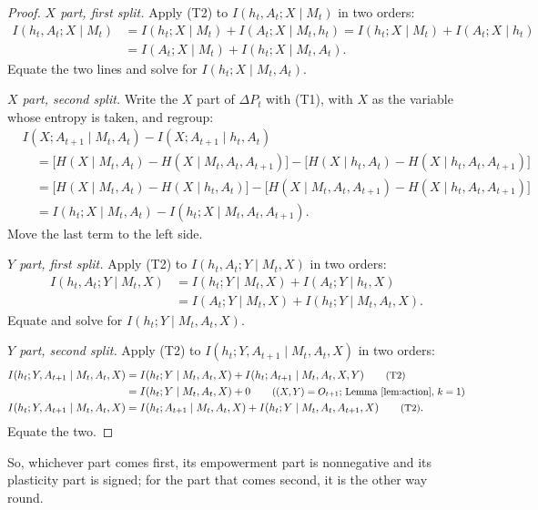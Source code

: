 \documentclass{article}
\theoremstyle{definition}
\theoremstyle{remark}
\newcommand{\dP}{\Delta P}
\newcommand{\why}[1]{\tag*{\small(#1)}}
\begin{document}
\begin{proof}
\emph{$X$ part, first split.} Apply (T2) to $I(h_t,A_t;X\mid M_t)$ in two orders:
\begin{align*}
I(h_t,A_t;X\mid M_t)&=I(h_t;X\mid M_t)+I(A_t;X\mid M_t,h_t)=I(h_t;X\mid M_t)+I(A_t;X\mid h_t) \why{T2; T4}\\
&=I(A_t;X\mid M_t)+I(h_t;X\mid M_t,A_t) \why{T2}.
\end{align*}
Equate the two lines and solve for $I(h_t;X\mid M_t,A_t)$.

\emph{$X$ part, second split.} Write the $X$ part of $\dP_t$ with (T1), with $X$ as the variable whose entropy is taken, and regroup:
\begin{align*}
&I(X;A_{t+1}\mid M_t,A_t)-I(X;A_{t+1}\mid h_t,A_t)\\
&\quad=\big[H(X\mid M_t,A_t)-H(X\mid M_t,A_t,A_{t+1})\big]-\big[H(X\mid h_t,A_t)-H(X\mid h_t,A_t,A_{t+1})\big] \why{T1}\\
&\quad=\big[H(X\mid M_t,A_t)-H(X\mid h_t,A_t)\big]-\big[H(X\mid M_t,A_t,A_{t+1})-H(X\mid h_t,A_t,A_{t+1})\big] \why{regroup}\\
&\quad=I(h_t;X\mid M_t,A_t)-I(h_t;X\mid M_t,A_t,A_{t+1}) \why{T4; T1}.
\end{align*}
Move the last term to the left side.

\emph{$Y$ part, first split.} Apply (T2) to $I(h_t,A_t;Y\mid M_t,X)$ in two orders:
\begin{align*}
I(h_t,A_t;Y\mid M_t,X)&=I(h_t;Y\mid M_t,X)+I(A_t;Y\mid h_t,X) \why{T2; T4}\\
&=I(A_t;Y\mid M_t,X)+I(h_t;Y\mid M_t,A_t,X) \why{T2}.
\end{align*}
Equate and solve for $I(h_t;Y\mid M_t,A_t,X)$.

\emph{$Y$ part, second split.} Apply (T2) to $I(h_t;Y,A_{t+1}\mid M_t,A_t,X)$ in two orders:
\begin{align*}
I(h_t;Y,A_{t+1}\mid M_t,A_t,X)&=I(h_t;Y\mid M_t,A_t,X)+I(h_t;A_{t+1}\mid M_t,A_t,X,Y) \why{T2}\\
&=I(h_t;Y\mid M_t,A_t,X)+0 \why{$(X,Y)=O_{t+1}$; Lemma~\ref{lem:action}, $k=1$}\\
I(h_t;Y,A_{t+1}\mid M_t,A_t,X)&=I(h_t;A_{t+1}\mid M_t,A_t,X)+I(h_t;Y\mid M_t,A_t,A_{t+1},X) \why{T2}.
\end{align*}
Equate the two.
\end{proof}

So, whichever part comes first, its empowerment part is nonnegative and its plasticity part is signed; for the part that comes second, it is the other way round.
\end{document}
